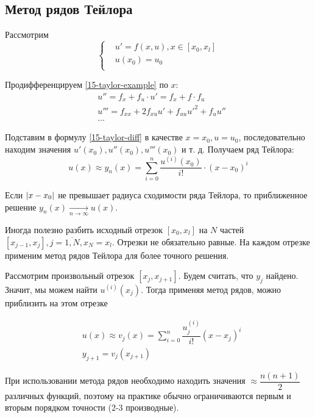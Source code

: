 \subsection{Метод рядов Тейлора}

Рассмотрим
\begin{equation}
  \label{15-taylor-example}
  \begin{cases}
    &u' = f(x, u), x \in [x_0, x_l]\\
    &u(x_0) = u_0\\
  \end{cases}
\end{equation}

Продифференцируем \eqref{15-taylor-example} по $x$:
\begin{equation}
  \label{15-taylor-diff}
  \begin{split}
    &u'' = f_x + f_u\cdot u' = f_x + f\cdot f_u\\
    &u''' = f_{xx} + 2f_{xu}u' + f_{uu}u'^2 + f_u u''\\
    &\ldots
  \end{split}
\end{equation}

Подставим в формулу \eqref{15-taylor-diff} в качестве $x = x_0, u = u_0$,
последовательно находим значения $u'(x_0), u''(x_0), u'''(x_0)$ и т. д.
Получаем ряд Тейлора:
\begin{equation}
  u(x) \approx y_n(x) = \sum\limits_{i = 0}^n\dfrac{u^{(i)}(x_0)}{i!}\cdot
  (x - x_0)^i
\end{equation}

Если $\left\lvert x - x_0 \right\rvert$ не превышает радиуса сходимости ряда Тейлора, то
приближенное решение $y_n(x) \xrightarrow[n \to \infty]{} u(x)$.

Иногда полезно разбить исходный отрезок $[x_0, x_l]$ на $N$ частей
$[x_{j - 1}, x_j], j = \overline{1, N}, x_N = x_l$. Отрезки не обязательно
равные. На каждом отрезке применим метод рядов Тейлора для более точного
решения.

Рассмотрим произвольный отрезок $[x_j, x_{j + 1}]$. Будем считать, что $y_j$
найдено. Значит, мы можем найти $u^{(i)}(x_j)$. Тогда применяя метод рядов,
можно приблизить на этом отрезке

\begin{equation}
  \begin{split}
    &u(x) \approx v_j(x) = \sum\limits_{i = 0}^n\dfrac{u_j^{(i)}}{i!}(x - x_j)^i\\
    &y_{j + 1} = v_j(x_{j + 1})
  \end{split}
\end{equation}

При использовании метода рядов необходимо находить значения
$\approx \dfrac{n(n + 1)}{2}$ различных функций, поэтому на практике обычно
ограничиваются первым и вторым порядком точности (2-3 производные).

